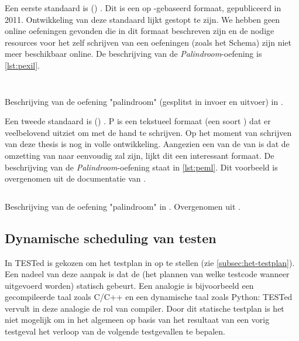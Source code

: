Een eerste standaard is  () \autocite{queiros2011pexil}.
Dit is een op -gebaseerd formaat, gepubliceerd in 2011.
Ontwikkeling van deze standaard lijkt gestopt te zijn.
We hebben geen online oefeningen gevonden die in dit formaat beschreven zijn en de nodige resources voor het zelf schrijven van een oefeningen (zoals het  Schema) zijn niet meer beschikbaar online.
De beschrijving van de \emph{Palindroom}-oefening is \cref{lst:pexil}.

\begin{listing}
    \inputminted{xml}{code/pexil-in.xml}
    \inputminted{xml}{code/pexil-out.xml}
    \caption{Beschrijving van de oefening "palindroom" (gesplitst in invoer en uitvoer) in .}
    \label{lst:pexil}
\end{listing}

Een tweede standaard is  () \autocite{peml}.
P is een tekstueel formaat (een soort ) dat er veelbelovend uitziet om met de hand te schrijven.
Op het moment van schrijven van deze thesis is  nog in volle ontwikkeling.
Aangezien een van de  van  is dat de omzetting van  naar  eenvoudig zal zijn, lijkt dit een interessant formaat.
De beschrijving van de \emph{Palindroom}-oefening staat in \cref{lst:peml}.
Dit voorbeeld is overgenomen uit de documentatie van .

\begin{listing}
    \inputminted{yaml}{code/peml.peml}
    \caption{
        Beschrijving van de oefening "palindroom" in .
        Overgenomen uit \autocite{peml}.
    }
    \label{lst:peml}
\end{listing}


\subsection{Dynamische scheduling van testen}\label{subsec:dynamische-scheduling-van-testen}

In TESTed is gekozen om het testplan in  op te stellen (zie \cref{subsec:het-testplan}).
Een nadeel van deze aanpak is dat de  (het plannen van welke testcode wanneer uitgevoerd worden) statisch gebeurt.
Een analogie is bijvoorbeeld een gecompileerde taal zoals C/C++ en een dynamische taal zoals Python: TESTed vervult in deze analogie de rol van compiler.
Door dit statische testplan is het niet mogelijk om in het algemeen op basis van het resultaat van een vorig testgeval het verloop van de volgende testgevallen te bepalen.

